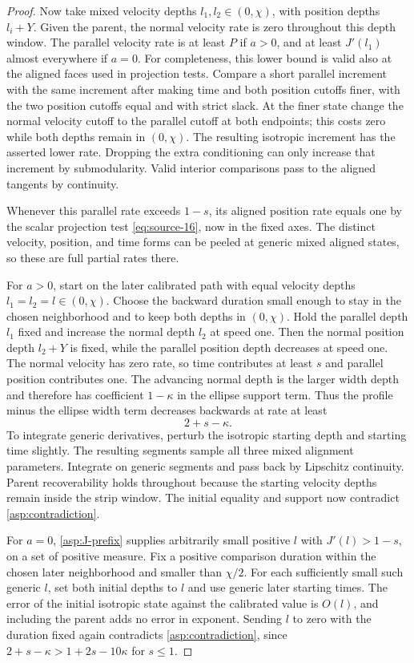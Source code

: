 \begin{proof}
Now take mixed velocity depths \(l_1,l_2\in(0,\chi)\), with position
depths \(l_i+Y\). Given the parent, the normal velocity rate is zero
throughout this depth window. The parallel velocity rate is at least \(P\)
if \(a>0\), and at least \(J'(l_1)\) almost everywhere if \(a=0\).
For completeness, this lower bound is valid also at the aligned faces used
in projection tests. Compare a short parallel increment with the same
increment after making time and both position cutoffs finer, with the two
position cutoffs equal and with strict slack. At the finer state change
the normal velocity cutoff to the parallel cutoff at both endpoints; this
costs zero while both depths remain in \((0,\chi)\). The resulting
isotropic increment has the asserted lower rate. Dropping the extra
conditioning can only increase that increment by submodularity. Valid
interior comparisons pass to the aligned tangents by continuity.

Whenever this parallel rate exceeds \(1-s\), its aligned position rate
equals one by the scalar projection test \eqref{eq:source-16}, now in the
fixed axes. The distinct velocity, position, and time forms can be peeled
at generic mixed aligned states, so these are full partial rates there.

For \(a>0\), start on the later calibrated path with equal velocity
depths \(l_1=l_2=l\in(0,\chi)\). Choose the backward duration small
enough to stay in the chosen neighborhood and to keep both depths in
\((0,\chi)\). Hold the parallel depth \(l_1\) fixed and increase the
normal depth \(l_2\) at speed one. Then the normal position depth
\(l_2+Y\) is fixed, while the parallel position depth decreases at
speed one. The normal velocity has zero rate, so time contributes at
least \(s\) and parallel position contributes one. The advancing normal
depth is the larger width depth and therefore has coefficient
\(1-\kappa\) in the ellipse support term. Thus the profile minus
the ellipse width term decreases backwards at rate at least
\begin{equation}\label{asp:stationary-gain}
2+s-\kappa.
\end{equation}
To integrate generic derivatives, perturb the isotropic starting depth and
starting time slightly. The resulting segments sample all three mixed
alignment parameters. Integrate on generic segments and pass back by
Lipschitz continuity. Parent recoverability holds throughout because the
starting velocity depths remain inside the strip window. The initial
equality and support now contradict \eqref{asp:contradiction}.

For \(a=0\), \eqref{asp:J-prefix} supplies arbitrarily small positive
\(l\) with \(J'(l)>1-s\), on a set of positive measure. Fix a positive
comparison duration within the chosen later neighborhood and smaller
than \(\chi/2\). For each sufficiently small such generic \(l\), set
both initial depths to \(l\) and use generic later starting times.
The error of the initial isotropic state against the calibrated value
is \(O(l)\), and
including the parent adds no error in exponent. Sending \(l\) to zero
with the duration fixed again contradicts \eqref{asp:contradiction}, since
\(2+s-\kappa>1+2s-10\kappa\) for \(s\le1\).
\end{proof}

